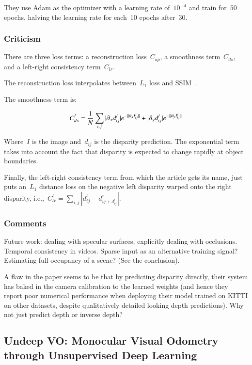 \documentclass[a4paper, 12pt]{article}
\DeclarePairedDelimiter\norm{\lVert}{\rVert}%
\begin{document}
They use Adam as the optimizer with a learning rate of~$10^{-4}$ and train
for~\num{50} epochs, halving the learning rate for each~\num{10} epochs
after~\num{30}.


\subsubsection{Criticism}

There are three loss terms: a reconstruction loss~$C_{ap}$, a smoothness
term~$C_{ds}$, and a left-right consistency term~$C_{lr}$.

The reconstruction loss interpolates between~$L_1$ loss and
SSIM~\citet{wang-image-ssim-2004}.

The smoothness term is:

\begin{equation*}
        C_{ds}^l = \frac{1}{N} \sum_{i, j}
                |\partial_x d_{ij}^l|e^{-\norm{\partial_x I_{ij}^l}} +
                |\partial_y d_{ij}^l|e^{-\norm{\partial_y I_{ij}^l}}
\end{equation*}

Where~$I$ is the image and~$d_{ij}$ is the disparity prediction. The
exponential term takes into account the fact that disparity is expected to
change rapidly at object boundaries.

Finally, the left-right consistency term from which the article gets its name,
just puts an~$L_1$ distance loss on the negative left disparity warped onto the
right disparity,
i.e.,~$C_{lr}^l = \sum_{i, j} |d_{ij}^l - d_{ij + d_{ij}^l}^r|$.


\subsubsection{Comments}

Future work: dealing with specular surfaces, explicitly dealing with
occlusions. Temporal consistency in videos. Sparse input as an alternative
training signal? Estimating full occupancy of a scene? (See the conclusion).

A flaw in the paper seems to be that by predicting disparity directly, their
system has baked in the camera calibration to the learned weights (and hence
they report poor numerical performance when deploying their model trained on
KITTI on other datasets, despite qualitatively detailed looking depth
predictions). Why not just predict depth or inverse depth?


\subsection{Undeep VO\@: Monocular Visual Odometry through Unsupervised Deep
            Learning~\citet{li-undeep-vo-2017}}
\end{document}
